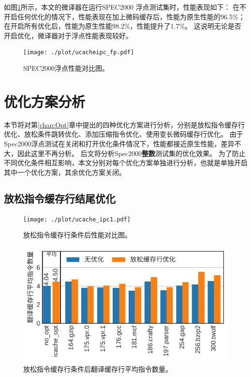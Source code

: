 如图\ref{img:ipc_fp}所示，本文的微译器在运行SPEC2000 浮点测试集时，性能表现如下：
在不开启任何优化的情况下，性能表现在加上微码缓存后，性能为原生性能的96.5\%；
在开启所有优化后，性能为原生性能98.2\%，性能提升了1.7\%。
这说明无论是否开启优化，微译器对于浮点性能表现较好。


\begin{figure}[!htbp]
  \centering
  \texttt{[image: ./plot/ucacheipc\_fp.pdf]}
  \caption{SPEC2000浮点性能对比图。}
  \label{img:ipc_fp}
\end{figure}


\section{优化方案分析}

本节将对第\ref{chap:Opt}章中提出的四种优化方案进行分析，分别是放松指令缓存行优化、放松条件跳转优化、添加压缩指令优化、使用变长微码缓存行优化。
由于Spec2000浮点测试在关闭和打开优化条件情况下，性能都接近原生性能，差异不大，因此这里不再分析。
后文将分析Spec2000\textbf{整数}测试集的优化效果。
为了防止不同优化条件相互影响，本文分别对每个优化方案单独进行分析，也就是单独开启其中一个优化方案，其余优化方案关闭。

\subsection{放松指令缓存行结尾优化}

\begin{figure}[!htbp]
  \centering
  \texttt{[image: ./plot/ucache\_ipc1.pdf]}
  \caption{放松指令缓存行条件后性能对比图。}
  \label{img:ipc1}
\end{figure}

\begin{figure}[!htbp]
  \centering
  \includegraphics[width=0.8\linewidth]{./plot/ucacheline_nums1.pdf}
  \caption{放松指令缓存行条件后翻译缓存行平均指令数量。}
  \label{img:ucacheline_nums1}
\end{figure}

